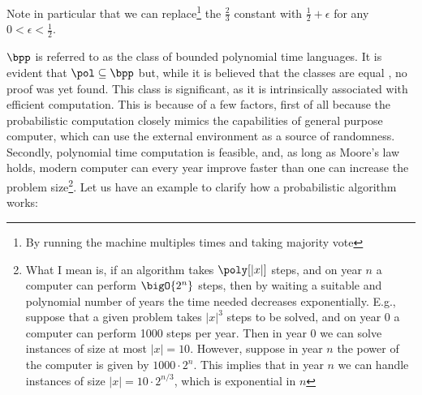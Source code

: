 \documentclass{article}
\begin{document}
Note in particular that we can replace\footnote{By running the machine multiples times and taking majority vote} the $\frac{2}{3}$ constant with $\frac{1}{2} + \epsilon$ for any $0 < \epsilon < \frac{1}{2}$.

$\bpp$ is referred to as the class of bounded polynomial time languages. It is evident that $\pol \subseteq \bpp$ but, while it is believed that the classes are equal \cite{goldreichWorldBPP2011}, no proof was yet found. This class is significant, as it is intrinsically associated with efficient computation. This is because of a few factors, first of all because the probabilistic computation closely mimics the capabilities of general purpose computer, which can use the external environment as a source of randomness. Secondly, polynomial time computation is feasible, and, as long as Moore's law holds, modern computer can every year improve faster than one can increase the problem size\footnote{What I mean is, if an algorithm takes $\poly[|x|]$ steps, and on year $n$ a computer can perform $\bigO{2^n}$ steps, then by waiting a suitable and polynomial number of years the time needed
    decreases exponentially. E.g., suppose that a given problem takes $|x|^3$ steps to be solved, and on year 0 a computer can
    perform 1000 steps per year. Then in year 0 we can solve instances of size at most $|x| = 10$. However, suppose in year $n$ the
    power of the computer is given by $1000 \cdot 2^n$. This implies that in year $n$ we can handle instances of size $|x| = 10 \cdot 2^{n/3} $, which is exponential in $n$}.
Let us have an example to clarify how a probabilistic algorithm works:
\end{document}
